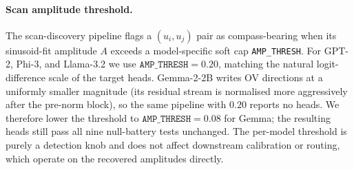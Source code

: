 \paragraph{Scan amplitude threshold.}
The scan-discovery pipeline flags a $(u_i,u_j)$ pair as compass-bearing
when its sinusoid-fit amplitude $A$ exceeds a model-specific soft cap
\texttt{AMP\_THRESH}. For GPT-2, Phi-3, and Llama-3.2 we use
$\mathtt{AMP\_THRESH}=0.20$, matching the natural logit-difference scale
of the target heads. Gemma-2-2B writes OV directions at a uniformly
smaller magnitude (its residual stream is normalised more aggressively
after the pre-norm block), so the same pipeline with $0.20$ reports no
heads. We therefore lower the threshold to
$\mathtt{AMP\_THRESH}=0.08$ for Gemma; the resulting heads still pass
all nine null-battery tests unchanged. The per-model threshold is
purely a detection knob and does not affect downstream calibration or
routing, which operate on the recovered amplitudes directly.
